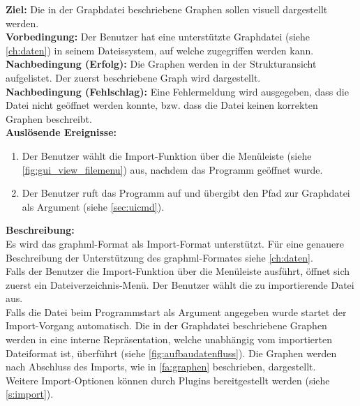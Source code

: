 \label{fa:import}
\textbf{Ziel:} Die in der Graphdatei beschriebene Graphen sollen visuell dargestellt werden.\\
\textbf{Vorbedingung:} Der Benutzer hat eine unterstützte Graphdatei (siehe \autoref{ch:daten}) in seinem Dateissystem, auf welche zugegriffen werden kann.\\
\textbf{Nachbedingung (Erfolg):} Die Graphen werden in der Strukturansicht aufgelistet. Der zuerst beschriebene Graph wird dargestellt.\\
\textbf{Nachbedingung (Fehlschlag):}
Eine Fehlermeldung wird ausgegeben, dass die Datei nicht geöffnet werden konnte, bzw. dass die Datei keinen korrekten Graphen beschreibt.\\
\textbf{Auslösende Ereignisse:}
\begin{enumerate}[nolistsep, label=(\alph*)]
  \item Der Benutzer wählt die Import-Funktion über die Menüleiste (siehe \ref{fig:gui_view_filemenu}) aus, nachdem das Programm geöffnet wurde.
  \item Der Benutzer ruft das Programm auf und übergibt den Pfad zur Graphdatei als Argument (siehe \autoref{sec:uicmd}).
\end{enumerate}
\textbf{Beschreibung:}\\
Es wird das \gls{graphml}-Format als Import-Format unterstützt. Für eine genauere Beschreibung der Unterstützung des \gls{graphml}-Formates siehe \autoref{ch:daten}.\\
Falls der Benutzer die Import-Funktion über die Menüleiste ausführt, öffnet sich zuerst ein Dateiverzeichnis-Menü.
Der Benutzer wählt die zu importierende Datei aus.\\
Falls die Datei beim Programmstart als Argument angegeben wurde startet der Import-Vorgang automatisch.
Die in der Graphdatei beschriebene Graphen werden in eine interne Repräsentation, welche unabhängig vom importierten Dateiformat ist, überführt (siehe \ref{fig:aufbaudatenfluss}).
Die Graphen werden nach Abschluss des Imports, wie in \ref{fa:graphen} beschrieben, dargestellt.\\
Weitere Import-Optionen können durch Plugins bereitgestellt werden (siehe \ref{s:import}).

